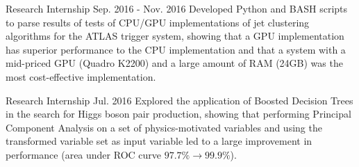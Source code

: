 \begin{cventries}
    {Research Internship}
    {}
    {Sep. 2016 - Nov. 2016}
    {Developed Python and BASH scripts to parse results of tests of CPU/GPU implementations of jet clustering algorithms for the ATLAS trigger system, showing that a GPU implementation has superior performance to the CPU implementation and that a system with a mid-priced GPU (Quadro K2200) and a large amount of RAM (24GB) was the most cost-effective implementation.}

    {Research Internship}
    {}
    {Jul. 2016}
    {Explored the application of Boosted Decision Trees in the search for Higgs boson pair production, showing that performing Principal Component Analysis on a set of physics-motivated variables and using the transformed variable set as input variable led to a large improvement in performance (area under ROC curve $97.7\% \to 99.9\%$).}


\end{cventries}